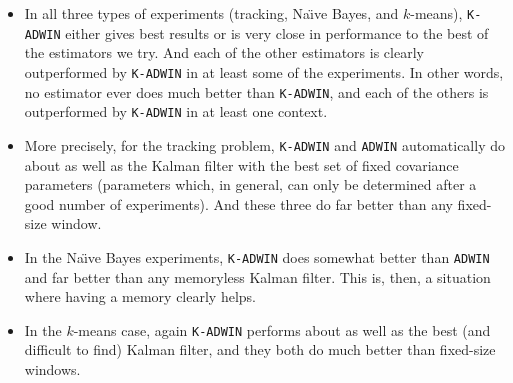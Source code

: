\begin{itemize}
\item In all three types of experiments (tracking, Na\"\i ve Bayes, and $k$-means), 
{\tt K-ADWIN} either gives best results or is very close in performance to the best 
of the estimators we try. And each of the other estimators is 
clearly outperformed by {\tt K-ADWIN}
in at least some of the experiments. In other words, no estimator ever does
much better than {\tt K-ADWIN}, and each of the others 
is outperformed by {\tt K-ADWIN} in at least one context. 
\item More precisely, for the tracking problem, {\tt K-ADWIN} and {\tt ADWIN} automatically
do about as well as the Kalman filter with the best set of fixed covariance parameters
(parameters which, in general, can only be determined after a good number of experiments). 
And these three do far better than any fixed-size window. 
\item In the Na\"\i ve Bayes experiments, {\tt K-ADWIN} does somewhat better than
{\tt ADWIN} and far better than any memoryless Kalman filter. This is, then, 
a situation where having a memory clearly helps. 
\item In the $k$-means case, again {\tt K-ADWIN} performs about as well 
as the best (and difficult to find) Kalman filter, 
and they both do much better than fixed-size windows.
\end{itemize}
\ENDOMIT